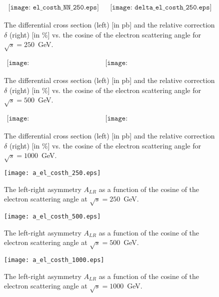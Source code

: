 \documentclass[%
 reprint,
amsmath,
amssymb,
 aps,
 prb,
 floatfix,
]{revtex4-1}
\begin{document}
\begin{figure*}
\[
\begin{array}{ccc}
  \texttt{[image: el\_costh\_NN\_250.eps]}
  &&
  \texttt{[image: delta\_el\_costh\_250.eps]}
  \end{array}
\]
\caption{The differential cross section (left) [in pb] and 
the relative correction $\delta$ (right) [in \%] vs. the cosine 
of the electron scattering angle for $\sqrt{s}=250$~GeV.}
\label{el_delta_costh_250}
\end{figure*}

\begin{figure*}
\[
\begin{array}{ccc}
  \texttt{[image: el\_costh\_NN\_500.eps]}
  &&
  \texttt{[image: delta\_el\_costh\_NN\_500.eps]}
  \end{array}
\]
\caption{The differential cross section (left) [in pb] and 
the relative correction $\delta$ (right) [in \%] vs. the cosine 
of the electron scattering angle for $\sqrt{s}=500$~GeV.}
\label{el_delta_costh_500}
\end{figure*}

\begin{figure*}
\[
\begin{array}{ccc}
  \texttt{[image: el\_costh\_NN\_1000.eps]}
  &&
  \texttt{[image: delta\_el\_costh\_NN\_1000.eps]}
  \end{array}
\]
\caption{The differential cross section (left) [in pb] and 
the relative correction $\delta$ (right) [in \%] vs. the cosine 
of the electron scattering angle for $\sqrt{s}=1000$~GeV.}
\label{el_delta_costh_1000}
\end{figure*}

\begin{figure}
  \texttt{[image: a\_el\_costh\_250.eps]}
\caption{The left-right asymmetry $A_{LR}$ as a function of the cosine of the electron 
scattering angle at $\sqrt{s}=250$~GeV.}
\label{a_el_costh-250}
\end{figure}
\begin{figure}
  \texttt{[image: a\_el\_costh\_500.eps]}
\caption{The left-right asymmetry $A_{LR}$ as a function of the cosine of the electron 
scattering angle at $\sqrt{s}=500$~GeV.}
\label{a_el_costh-500}
\end{figure}
\begin{figure}
  \texttt{[image: a\_el\_costh\_1000.eps]}  
\caption{The left-right asymmetry $A_{LR}$ as a function of the cosine of the electron 
scattering angle at $\sqrt{s}=1000$~GeV.}
\label{a_el_costh-1000}
\end{figure}
\end{document}
